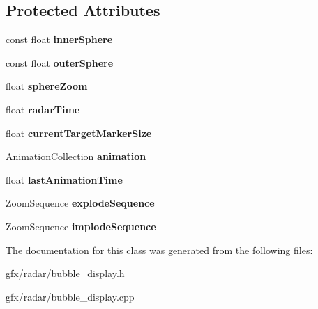 \subsection*{Protected Attributes}
\begin{DoxyCompactItemize}
\item 
const float {\bfseries inner\+Sphere}\hypertarget{classRadar_1_1BubbleDisplay_a19f6d87a140c8ba1ef2ce022049bf52f}{}\label{classRadar_1_1BubbleDisplay_a19f6d87a140c8ba1ef2ce022049bf52f}

\item 
const float {\bfseries outer\+Sphere}\hypertarget{classRadar_1_1BubbleDisplay_a16aa371aecaa93edca07814c656d797d}{}\label{classRadar_1_1BubbleDisplay_a16aa371aecaa93edca07814c656d797d}

\item 
float {\bfseries sphere\+Zoom}\hypertarget{classRadar_1_1BubbleDisplay_a78823c4db1bdb3e94f5888db0e1480a9}{}\label{classRadar_1_1BubbleDisplay_a78823c4db1bdb3e94f5888db0e1480a9}

\item 
float {\bfseries radar\+Time}\hypertarget{classRadar_1_1BubbleDisplay_a02327f621ebde497a76cbe6aa6360aa5}{}\label{classRadar_1_1BubbleDisplay_a02327f621ebde497a76cbe6aa6360aa5}

\item 
float {\bfseries current\+Target\+Marker\+Size}\hypertarget{classRadar_1_1BubbleDisplay_a71449ec85bf0de96041016f262c75fb7}{}\label{classRadar_1_1BubbleDisplay_a71449ec85bf0de96041016f262c75fb7}

\item 
Animation\+Collection {\bfseries animation}\hypertarget{classRadar_1_1BubbleDisplay_a7fa0a6bdeeb2194f1dcb3cac7669ef8c}{}\label{classRadar_1_1BubbleDisplay_a7fa0a6bdeeb2194f1dcb3cac7669ef8c}

\item 
float {\bfseries last\+Animation\+Time}\hypertarget{classRadar_1_1BubbleDisplay_a1847e9c8b1501a2a36875f2a69b8eec9}{}\label{classRadar_1_1BubbleDisplay_a1847e9c8b1501a2a36875f2a69b8eec9}

\item 
Zoom\+Sequence {\bfseries explode\+Sequence}\hypertarget{classRadar_1_1BubbleDisplay_a6ef3380e71c3d2b9c9882323bba3213e}{}\label{classRadar_1_1BubbleDisplay_a6ef3380e71c3d2b9c9882323bba3213e}

\item 
Zoom\+Sequence {\bfseries implode\+Sequence}\hypertarget{classRadar_1_1BubbleDisplay_ab4eb850f596272ea0b9bf350a26610ce}{}\label{classRadar_1_1BubbleDisplay_ab4eb850f596272ea0b9bf350a26610ce}

\end{DoxyCompactItemize}


The documentation for this class was generated from the following files\+:\begin{DoxyCompactItemize}
\item 
gfx/radar/bubble\+\_\+display.\+h\item 
gfx/radar/bubble\+\_\+display.\+cpp\end{DoxyCompactItemize}

